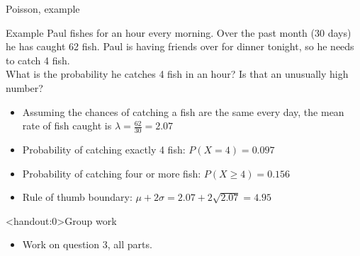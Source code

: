 \documentclass[xcolor=table, handout]{beamer}
\begin{document}
\begin{frame}{Poisson, example}
\begin{exampleblock}{Example}
Paul fishes for an hour every morning. Over the past month (30 days) he has caught 62 fish. Paul is having friends over for dinner tonight, so he needs to catch 4 fish.\\
\medskip
What is the probability he catches 4 fish in an hour? Is that an unusually high number?
\begin{itemize}
\pause\item Assuming the chances of catching a fish are the same every day, the mean rate of fish caught is $\lambda = \frac {62}{30} = 2.07$
\pause\item Probability of catching exactly 4 fish: $P(X=4) = 0.097$
\pause\item Probability of catching four or more fish: $P(X \ge 4) = 0.156$
\pause\item Rule of thumb boundary: $\mu + 2 \sigma = 2.07 + 2 \sqrt{2.07} = 4.95$ 
\end{itemize}
\end{exampleblock}
\end{frame}

\begin{frame}<handout:0>{Group work}
\begin{block}{}
\large
\begin{itemize}
\item Work on question 3, all parts.
\end{itemize}
\end{block}
\end{frame}
\end{document}
